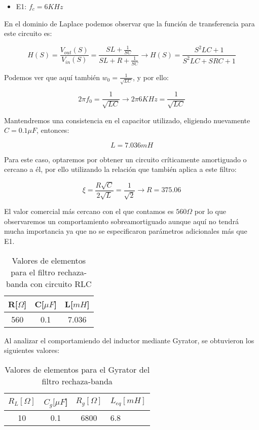 \begin{itemize}
	\item E1: $f_c=6 KHz$
\end{itemize}

En el dominio de Laplace podemos observar que la función de transferencia para este circuito es:

$$H(S)=\frac{V_{out}(S)}{V_{in}(S)}=\frac{SL+\frac{1}{SC}}{SL+R+\frac{1}{SC}} \longrightarrow H(S)=\frac{S^{2}LC+1}{S^2LC+SRC+1}$$

Podemos ver que aquí también $w_0=\frac{1}{\sqrt{LC}}$, y por ello:

$$2 \pi f_0 = \frac{1}{\sqrt{LC}} \longrightarrow 2 \pi 6KHz = \frac{1}{\sqrt{LC}}$$

Mantendremos una consistencia en el capacitor utilizado, eligiendo nuevamente $C=0.1 \mu F$, entonces:

$$L = 7.036 mH$$

Para este caso, optaremos por obtener un circuito críticamente amortiguado o cercano a él, por ello utilizando la relación que también aplica a este
filtro:

$$\xi=\frac{R \sqrt{C}}{2\sqrt{L}}=\frac{1}{\sqrt{2}} \longrightarrow R=375.06$$

El valor comercial más cercano con el que contamos es $560 \Omega$ por lo que observaremos un comportamiento sobreamortiguado aunque aquí
no tendrá mucha importancia ya que no se especificaron parámetros adicionales más que E1.

\begin{table}[H]
    \centering
    \begin{tabular}{|c|c|c|}
    \hline
    \rowcolor[HTML]{C0C0C0} 
    R[$\Omega$] & C[$\mu F$] & L[$mH$]  \\ \hline
    560     & 0.1  & 7.036 \\ \hline
    \end{tabular}
    \caption{Valores de elementos para el filtro rechaza-banda con circuito RLC}
    \end{table}

Al analizar el comportamiendo del inductor mediante Gyrator, se obtuvieron los siguientes valores:

\begin{table}[H]
    \centering
    \begin{tabular}{|c|c|c|l|}
    \hline
    \rowcolor[HTML]{C0C0C0} 
    $R_L[\Omega]$ & $C_g[\mu F$] & $R_g[\Omega]$  & $L_{eq}[mH]$ \\ \hline
    10      & 0.1  & 6800 & 6.8        \\ \hline
    \end{tabular}
    \caption{Valores de elementos para el Gyrator del filtro rechaza-banda}
    \end{table}

